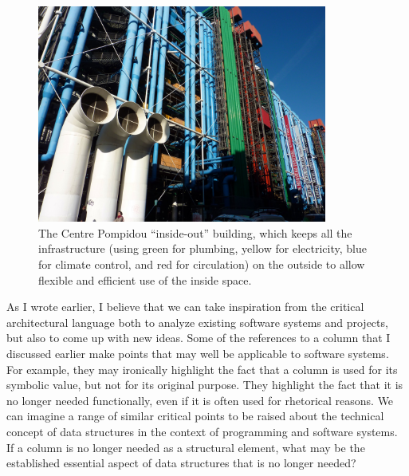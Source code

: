 \begin{figure}
\centering
\includegraphics[width=0.85\textwidth]{fig/pompidou.jpg}\quad
\caption{The Centre Pompidou ``inside-out'' building, which keeps all the infrastructure
(using green for plumbing, yellow for electricity, blue for climate control, and red for
circulation) on the outside to allow flexible and efficient use of the inside space.}
\label{fig:pompidou}
\end{figure}

As I wrote earlier, I believe that we can take inspiration from the critical architectural
language both to analyze existing software systems and projects, but also to come up with
new ideas. Some of the references to a column that I discussed earlier make points that
may well be applicable to software systems. For example, they may ironically highlight the fact
that a column is used for its symbolic value, but not for its original purpose.
They highlight the fact that it is no longer needed functionally, even if it is often used
for rhetorical reasons.
We can imagine a range of similar critical points to be raised about the technical concept
of data structures in the context of programming and software systems. If a column is no longer
needed as a structural element, what may be the established essential aspect of data structures
that is no longer needed?

